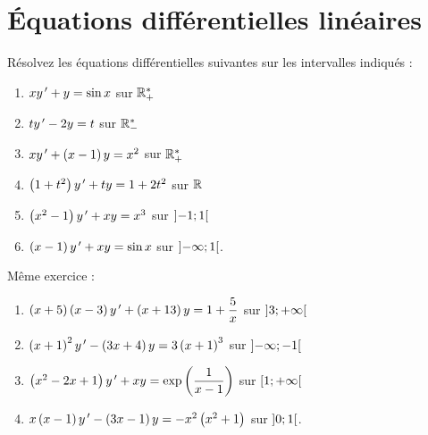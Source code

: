 \chapter{Équations différentielles linéaires}

\minitoc

\legendeexercices

\begin{exos}
Résolvez les équations différentielles suivantes sur les intervalles indiqués :

\begin{enumerate}
    \item \(xy^{\,\prime}+y=\sin x\) sur \(\mathbb{R}_+^*\) \\
    \item \(ty^{\,\prime}-2y=t\) sur \(\mathbb{R}_-^*\) \\
    \item \(xy^{\,\prime}+\left(x-1\right)y=x^2\) sur \(\mathbb{R}_+^*\) \\
    \item \(\left(1+t^2\right)y^{\,\prime}+ty=1+2t^2\) sur \(\mathbb{R}\) \\
    \item \(\left(x^2-1\right)y^{\,\prime}+xy=x^3\) sur \(\left]-1;1\right[\) \\
    \item \(\left(x-1\right)y^{\,\prime}+xy=\sin x\) sur \(\left]-\infty;1\right[\).
\end{enumerate}
\end{exos}

\begin{exos}
Même exercice :

\begin{enumerate}
    \item \(\left(x+5\right)\left(x-3\right)y^{\,\prime}+\left(x+13\right)y=1+\dfrac{5}{x}\) sur \(\left]3;+\infty\right[\) \\
    \item \(\left(x+1\right)^2y^{\,\prime}-\left(3x+4\right)y=3\left(x+1\right)^3\) sur \(\left]-\infty;-1\right[\) \\
    \item \(\left(x^2-2x+1\right)y^{\,\prime}+xy=\exp\left(\dfrac{1}{x-1}\right)\) sur \(\left[1;+\infty\right[\) \\
    \item \(x\left(x-1\right)y^{\,\prime}-\left(3x-1\right)y=-x^2\left(x^2+1\right)\) sur \(\left]0;1\right[\).
\end{enumerate}
\end{exos}


